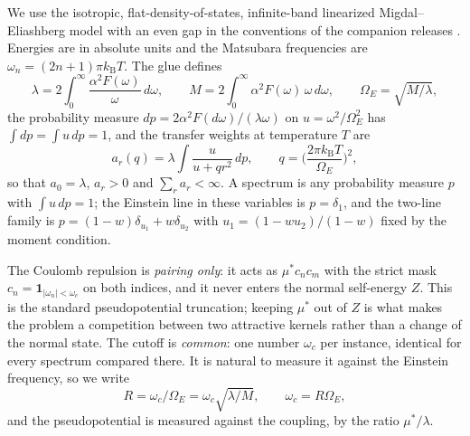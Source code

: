 \documentclass[11pt]{article}
\newcommand{\kb}{k_{\mathrm B}}
\newcommand{\OmE}{\Omega_E}
\newcommand{\muS}{\mu^{*}}
\theoremstyle{definition}
\theoremstyle{remark}
\begin{document}
We use the isotropic, flat-density-of-states, infinite-band linearized Migdal--Eliashberg
model with an even gap in the conventions of the companion releases
\cite{finiteband,univglue}. Energies are in absolute units and the Matsubara frequencies
are $\omega_n=(2n+1)\pi\kb T$. The glue defines
\begin{equation}\label{eq:const}
\lambda=2\int_0^\infty\frac{\alpha^2F(\omega)}{\omega}\,d\omega,\qquad
M=2\int_0^\infty\alpha^2F(\omega)\,\omega\,d\omega,\qquad
\OmE=\sqrt{M/\lambda},
\end{equation}
the probability measure $dp=2\alpha^2F(d\omega)/(\lambda\omega)$ on
$u=\omega^2/\OmE^2$ has $\int dp=\int u\,dp=1$, and the transfer weights at temperature
$T$ are
\begin{equation}\label{eq:transfers}
a_r(q)=\lambda\int\frac{u}{u+qr^2}\,dp,\qquad q=\Big(\frac{2\pi\kb T}{\OmE}\Big)^2,
\end{equation}
so that $a_0=\lambda$, $a_r>0$ and $\sum_r a_r<\infty$. A spectrum is any probability
measure $p$ with $\int u\,dp=1$; the Einstein line in these variables is
$p=\delta_1$, and the two-line family is $p=(1-w)\delta_{u_1}+w\delta_{u_2}$ with
$u_1=(1-wu_2)/(1-w)$ fixed by the moment condition.

The Coulomb repulsion is \emph{pairing only}: it acts as $\muS c_nc_m$ with the strict
mask $c_n=\mathbf 1_{|\omega_n|<\omega_c}$ on both indices, and it never enters the normal
self-energy $Z$. This is the standard pseudopotential truncation; keeping $\muS$ out of
$Z$ is what makes the problem a competition between two attractive kernels rather than a
change of the normal state. The cutoff is \emph{common}: one number $\omega_c$ per
instance, identical for every spectrum compared there. It is natural to measure it
against the Einstein frequency, so we write
\begin{equation}\label{eq:R}
R=\omega_c/\OmE=\omega_c\sqrt{\lambda/M},\qquad \omega_c=R\OmE,
\end{equation}
and the pseudopotential is measured against the coupling, by the ratio
$\muS/\lambda$.
\end{document}

